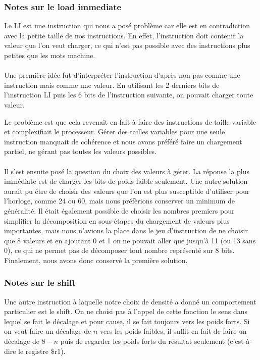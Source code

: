 \documentclass{article}
\begin{document}
\subsubsection{Notes sur le load immediate}
Le LI est une instruction qui nous a posé problème car elle est en contradiction
avec la petite taille de nos instructions. En effet, l'instruction doit contenir
la valeur que l'on veut charger, ce qui n'est pas possible avec des instructions
plus petites que les mots machine.

\paragraph{}
Une première idée fut d'interpréter l'instruction d'après non pas comme une
instruction mais comme une valeur. En utilisant les 2 derniers bits de l'instruction
LI puis les 6 bits de l'instruction suivante, on pouvait charger toute valeur.

Le problème est que cela revenait en fait à faire des instructions de taille variable
et complexifiait le processeur. Gérer des tailles variables pour une seule instruction
manquait de cohérence et nous avons préféré faire un chargement partiel, ne gérant
pas toutes les valeurs possibles.

\paragraph{}
Il s'est ensuite posé la question du choix des valeurs à gérer. La réponse la plus immédiate
est de charger les bits de poids faible seulement. Une autre solution aurait
pu être de choisir des valeurs que l'on est plus susceptible d'utiliser pour l'horloge,
comme 24 ou 60, mais nous préfèrions conserver un minimum de généralité. Il était
également possible de choisir les nombres premiers pour simplifier la décomposition
en sous-étapes du chargement de valeurs plus importantes, mais nous n'avions la place
dans le jeu d'instruction de ne choisir que 8 valeurs et en ajoutant 0 et 1 on ne
pouvait aller que jusqu'à 11 (ou 13 sans 0), ce qui ne permet pas de décomposer
tout nombre représenté sur 8 bits. Finalement, nous avons donc conservé la première
solution.

\subsubsection{Notes sur le shift}
Une autre instruction à laquelle notre choix de densité a donné un comportement
particulier est le shift. On ne choisi pas à l'appel de cette fonction le sens dans
lequel se fait le décalage et pour cause, il se fait toujours vers les poids forts.
Si on veut faire un décalage de $n$ vers les poids faibles, il suffit en fait de
faire un décalage de $8 - n$ puis de regarder les poids forts du résultat seulement
(c'est-à-dire le registre \$r1).
\end{document}

